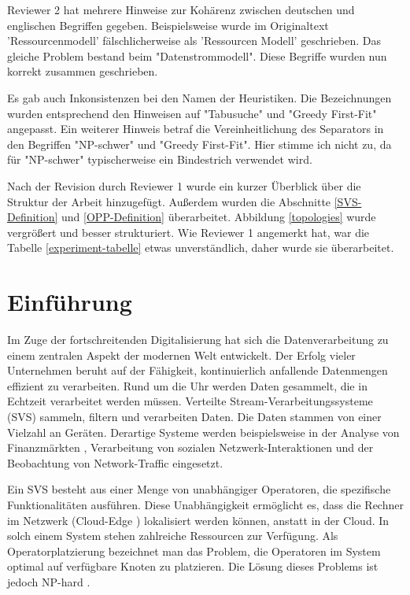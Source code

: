 \documentclass{article}
\begin{document}
Reviewer 2 hat mehrere Hinweise zur Kohärenz zwischen deutschen und englischen Begriffen gegeben. Beispielsweise wurde im Originaltext 'Ressourcenmodell' fälschlicherweise als 'Ressourcen Modell' geschrieben. Das gleiche Problem bestand beim "Datenstrommodell". Diese Begriffe wurden nun korrekt zusammen geschrieben.

Es gab auch Inkonsistenzen bei den Namen der Heuristiken. Die Bezeichnungen wurden entsprechend den Hinweisen auf "Tabusuche" und "Greedy First-Fit" angepasst. Ein weiterer Hinweis betraf die Vereinheitlichung des Separators in den Begriffen "NP-schwer" und "Greedy First-Fit". Hier stimme ich nicht zu, da für "NP-schwer" typischerweise ein Bindestrich verwendet wird.

Nach der Revision durch Reviewer 1 wurde ein kurzer Überblick über die Struktur der Arbeit hinzugefügt. Außerdem wurden die Abschnitte \ref{SVS-Definition} und \ref{OPP-Definition} überarbeitet. Abbildung \ref{topologies} wurde vergrößert und besser strukturiert. Wie Reviewer 1 angemerkt hat, war die Tabelle \ref{experiment-tabelle} etwas unverständlich, daher wurde sie überarbeitet.


\section{Einführung}
Im Zuge der fortschreitenden Digitalisierung hat sich die Datenverarbeitung zu einem zentralen Aspekt der modernen Welt entwickelt.
Der Erfolg vieler Unternehmen beruht auf der Fähigkeit, kontinuierlich anfallende Datenmengen effizient zu verarbeiten.
Rund um die Uhr werden Daten gesammelt, die in Echtzeit verarbeitet werden müssen. 
Verteilte Stream-Verarbeitungssysteme (SVS) sammeln, filtern und verarbeiten Daten. Die Daten stammen von einer Vielzahl an Geräten.
Derartige Systeme werden beispielsweise in der Analyse von Finanzmärkten \cite{k5}, 
Verarbeitung von sozialen Netzwerk-Interaktionen und der Beobachtung von Network-Traffic \cite{k5} 
eingesetzt. 

Ein SVS besteht aus einer Menge von unabhängiger Operatoren, die spezifische
Funktionalitäten ausführen. Diese Unabhängigkeit ermöglicht es, dass die Rechner im Netzwerk (Cloud-Edge \cite{k6}) lokalisiert werden können, 
anstatt in der Cloud.
In solch einem System stehen zahlreiche Ressourcen zur Verfügung. 
Als Operatorplatzierung bezeichnet man das Problem, 
die Operatoren im System optimal auf verfügbare Knoten zu platzieren. 
Die Lösung dieses Problems ist jedoch NP-hard \cite{cardellini-optimal_operatorplc}.
\end{document}
